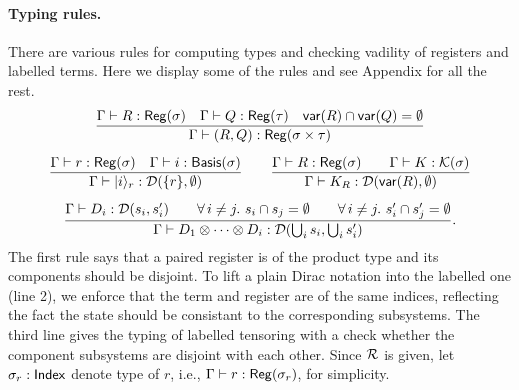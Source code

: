 \paragraph*{Typing rules.}
There are various rules for computing types and checking vadility of registers and labelled terms. Here we display some of the rules and see Appendix for all the rest.
\begin{gather*}
  \frac{
      \Gamma \vdash R : \mathsf{Reg}(\sigma) \quad
      \Gamma \vdash Q : \mathsf{Reg}(\tau)
      \quad \mathsf{var}(R) \cap \mathsf{var}(Q) = \emptyset
  }{\Gamma \vdash (R,Q) : \mathsf{Reg}(\sigma \times \tau)} \\[0.2cm]
  \frac{
          \Gamma \vdash r : \mathsf{Reg}(\sigma) \quad
          \Gamma \vdash i : \mathsf{Basis}(\sigma)}
  {\Gamma \vdash |i\rangle_r : \mathcal{D}(\{r\}, \emptyset)}
  \qquad
  \frac{\Gamma \vdash R : \mathsf{Reg}(\sigma)\qquad \Gamma \vdash K : \mathcal{K}(\sigma)}{\Gamma \vdash K_R : \mathcal{D}(\mathsf{var}(R), \emptyset)} \\[0.2cm]
    \frac{
        \Gamma \vdash D_i : \mathcal{D}(s_i,s_i') \qquad
        \forall\,i\neq j.\ s_i\cap s_j = \emptyset \qquad
        \forall\,i\neq j.\ s'_i\cap s'_j = \emptyset
    }
    {\Gamma \vdash D_1 \otimes \cdots \otimes D_i : \mathcal{D}(\bigcup_i s_i, \bigcup_i s_i')}.
\end{gather*}
The first rule says that a paired register is of the product type and its components should be disjoint.
To lift a plain Dirac notation into the labelled one (line 2), we enforce that the term and register are of the same indices, reflecting the fact the state should be consistant to the corresponding subsystems.
The third line gives the typing of labelled tensoring with a check whether the component subsystems are disjoint with each other.
Since $\mathcal{R}$ is given, let $\sigma_r : \mathsf{Index}$ denote type of $r$, i.e.,  $\Gamma\vdash r : \mathsf{Reg}(\sigma_r)$, for simplicity.


